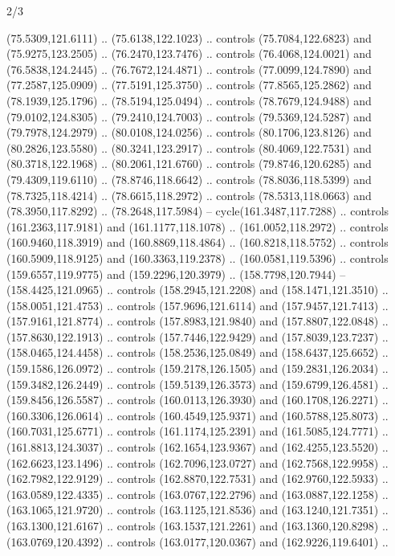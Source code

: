 \begin{flagdescription}{2/3}
\begin{scope}[shift={(0.5\flaglength,0.5)},scale=\flagwidth/320]
\begin{scope}[y=0.8pt, x=0.8pt, yscale=-1,shift={(-118.3,-146)}]
  (75.5309,121.6111) .. (75.6138,122.1023) .. controls (75.7084,122.6823) and
  (75.9275,123.2505) .. (76.2470,123.7476) .. controls (76.4068,124.0021) and
  (76.5838,124.2445) .. (76.7672,124.4871) .. controls (77.0099,124.7890) and
  (77.2587,125.0909) .. (77.5191,125.3750) .. controls (77.8565,125.2862) and
  (78.1939,125.1796) .. (78.5194,125.0494) .. controls (78.7679,124.9488) and
  (79.0102,124.8305) .. (79.2410,124.7003) .. controls (79.5369,124.5287) and
  (79.7978,124.2979) .. (80.0108,124.0256) .. controls (80.1706,123.8126) and
  (80.2826,123.5580) .. (80.3241,123.2917) .. controls (80.4069,122.7531) and
  (80.3718,122.1968) .. (80.2061,121.6760) .. controls (79.8746,120.6285) and
  (79.4309,119.6110) .. (78.8746,118.6642) .. controls (78.8036,118.5399) and
  (78.7325,118.4214) .. (78.6615,118.2972) .. controls (78.5313,118.0663) and
  (78.3950,117.8292) .. (78.2648,117.5984) -- cycle(161.3487,117.7288) ..
  controls (161.2363,117.9181) and (161.1177,118.1078) .. (161.0052,118.2972) ..
  controls (160.9460,118.3919) and (160.8869,118.4864) .. (160.8218,118.5752) ..
  controls (160.5909,118.9125) and (160.3363,119.2378) .. (160.0581,119.5396) ..
  controls (159.6557,119.9775) and (159.2296,120.3979) .. (158.7798,120.7944) --
  (158.4425,121.0965) .. controls (158.2945,121.2208) and (158.1471,121.3510) ..
  (158.0051,121.4753) .. controls (157.9696,121.6114) and (157.9457,121.7413) ..
  (157.9161,121.8774) .. controls (157.8983,121.9840) and (157.8807,122.0848) ..
  (157.8630,122.1913) .. controls (157.7446,122.9429) and (157.8039,123.7237) ..
  (158.0465,124.4458) .. controls (158.2536,125.0849) and (158.6437,125.6652) ..
  (159.1586,126.0972) .. controls (159.2178,126.1505) and (159.2831,126.2034) ..
  (159.3482,126.2449) .. controls (159.5139,126.3573) and (159.6799,126.4581) ..
  (159.8456,126.5587) .. controls (160.0113,126.3930) and (160.1708,126.2271) ..
  (160.3306,126.0614) .. controls (160.4549,125.9371) and (160.5788,125.8073) ..
  (160.7031,125.6771) .. controls (161.1174,125.2391) and (161.5085,124.7771) ..
  (161.8813,124.3037) .. controls (162.1654,123.9367) and (162.4255,123.5520) ..
  (162.6623,123.1496) .. controls (162.7096,123.0727) and (162.7568,122.9958) ..
  (162.7982,122.9129) .. controls (162.8870,122.7531) and (162.9760,122.5933) ..
  (163.0589,122.4335) .. controls (163.0767,122.2796) and (163.0887,122.1258) ..
  (163.1065,121.9720) .. controls (163.1125,121.8536) and (163.1240,121.7351) ..
  (163.1300,121.6167) .. controls (163.1537,121.2261) and (163.1360,120.8298) ..
  (163.0769,120.4392) .. controls (163.0177,120.0367) and (162.9226,119.6401) ..

\end{scope}
\end{scope}
\end{flagdescription}
